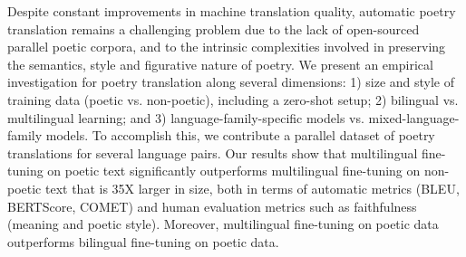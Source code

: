 Despite constant improvements in machine translation quality, automatic poetry translation remains a challenging problem due to the lack of open-sourced parallel poetic corpora, and to the intrinsic complexities involved in preserving the semantics, style and figurative nature of poetry. We present an empirical investigation for poetry translation along several dimensions: 1) size and style of training data (poetic vs. non-poetic), including a zero-shot setup; 2) bilingual vs. multilingual learning; and 3) language-family-specific models vs. mixed-language-family models. To accomplish this, we contribute a parallel dataset of poetry translations for several language pairs. Our results show that multilingual fine-tuning on poetic text significantly outperforms multilingual fine-tuning on non-poetic text that is 35X larger in size, both in terms of automatic metrics (BLEU, BERTScore, COMET) and human evaluation metrics such as faithfulness (meaning and poetic style). Moreover, multilingual fine-tuning on poetic data outperforms bilingual fine-tuning on poetic data.
